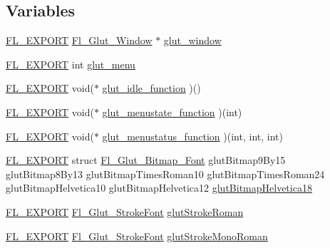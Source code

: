 \subsection*{Variables}
\begin{DoxyCompactItemize}
\item 
\hyperlink{_fl___export_8_h_aa9ba29a18aee9d738370a06eeb4470fc}{F\+L\+\_\+\+E\+X\+P\+O\+RT} \hyperlink{class_fl___glut___window}{Fl\+\_\+\+Glut\+\_\+\+Window} $\ast$ \hyperlink{glut_8_h_abe16b0fb4e8df6004f066dca3bf926c3}{glut\+\_\+window}
\item 
\hyperlink{_fl___export_8_h_aa9ba29a18aee9d738370a06eeb4470fc}{F\+L\+\_\+\+E\+X\+P\+O\+RT} int \hyperlink{glut_8_h_abd9dd74138d4afb2c49cf9b1706b60f1}{glut\+\_\+menu}
\item 
\hyperlink{_fl___export_8_h_aa9ba29a18aee9d738370a06eeb4470fc}{F\+L\+\_\+\+E\+X\+P\+O\+RT} void($\ast$ \hyperlink{glut_8_h_a0d3e0fb3556275a217520263f69a1fae}{glut\+\_\+idle\+\_\+function} )()
\item 
\hyperlink{_fl___export_8_h_aa9ba29a18aee9d738370a06eeb4470fc}{F\+L\+\_\+\+E\+X\+P\+O\+RT} void($\ast$ \hyperlink{glut_8_h_a8a8e89d0b64bba7e3bd7b42af3cd9cb0}{glut\+\_\+menustate\+\_\+function} )(int)
\item 
\hyperlink{_fl___export_8_h_aa9ba29a18aee9d738370a06eeb4470fc}{F\+L\+\_\+\+E\+X\+P\+O\+RT} void($\ast$ \hyperlink{glut_8_h_aee6e7a141044d23704f29f3c7c15899d}{glut\+\_\+menustatus\+\_\+function} )(int, int, int)
\item 
\hyperlink{_fl___export_8_h_aa9ba29a18aee9d738370a06eeb4470fc}{F\+L\+\_\+\+E\+X\+P\+O\+RT} struct \hyperlink{struct_fl___glut___bitmap___font}{Fl\+\_\+\+Glut\+\_\+\+Bitmap\+\_\+\+Font} glut\+Bitmap9\+By15 glut\+Bitmap8\+By13 glut\+Bitmap\+Times\+Roman10 glut\+Bitmap\+Times\+Roman24 glut\+Bitmap\+Helvetica10 glut\+Bitmap\+Helvetica12 \hyperlink{glut_8_h_ad57d041683756c27cdbb7a61285aacb6}{glut\+Bitmap\+Helvetica18}
\item 
\hyperlink{_fl___export_8_h_aa9ba29a18aee9d738370a06eeb4470fc}{F\+L\+\_\+\+E\+X\+P\+O\+RT} \hyperlink{struct_fl___glut___stroke_font}{Fl\+\_\+\+Glut\+\_\+\+Stroke\+Font} \hyperlink{glut_8_h_a6cbb84959750222990a4b0403109897e}{glut\+Stroke\+Roman}
\item 
\hyperlink{_fl___export_8_h_aa9ba29a18aee9d738370a06eeb4470fc}{F\+L\+\_\+\+E\+X\+P\+O\+RT} \hyperlink{struct_fl___glut___stroke_font}{Fl\+\_\+\+Glut\+\_\+\+Stroke\+Font} \hyperlink{glut_8_h_a4e03095fb5f41b25ebcef0a4e38f6ead}{glut\+Stroke\+Mono\+Roman}
\end{DoxyCompactItemize}


